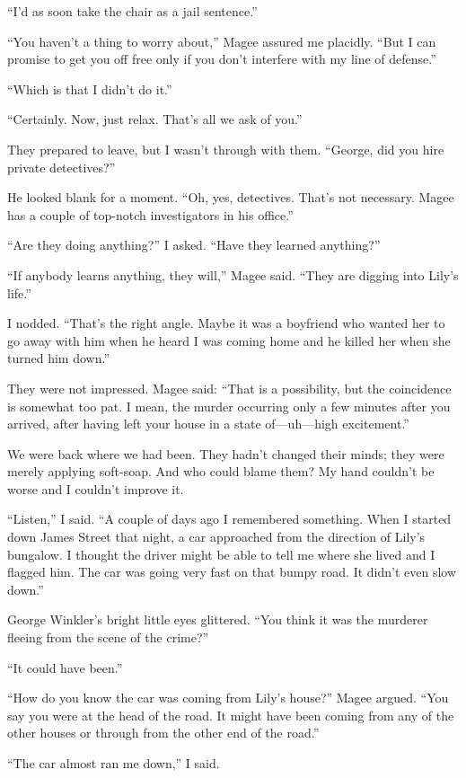 \documentclass{novel}
\begin{document}
“I’d as soon take the chair as a jail sentence.”

“You haven’t a thing to worry about,” Magee assured me placidly. “But I can promise to get you off free only if you don’t interfere with my line of defense.”

“Which is that I didn’t do it.”

“Certainly. Now, just relax. That’s all we ask of you.”

They prepared to leave, but I wasn’t through with them. “George, did you hire private detectives?”

He looked blank for a moment. “Oh, yes, detectives. That’s not necessary. Magee has a couple of top-notch investigators in his office.”

“Are they doing anything?” I asked. “Have they learned anything?”

“If anybody learns anything, they will,” Magee said. “They are digging into Lily’s life.”

I nodded. “That’s the right angle. Maybe it was a boyfriend who wanted her to go away with him when he heard I was coming home and he killed her when she turned him down.”

They were not impressed. Magee said: “That is a possibility, but the coincidence is somewhat too pat. I mean, the murder occurring only a few minutes after you arrived, after having left your house in a state of—uh—high excitement.”

We were back where we had been. They hadn’t changed their minds; they were merely applying soft-soap. And who could blame them? My hand couldn’t be worse and I couldn’t improve it.

“Listen,” I said. “A couple of days ago I remembered something. When I started down James Street that night, a car approached from the direction of Lily’s bungalow. I thought the driver might be able to tell me where she lived and I flagged him. The car was going very fast on that bumpy road. It didn’t even slow down.”

George Winkler’s bright little eyes glittered. “You think it was the murderer fleeing from the scene of the crime?”

“It could have been.”

“How do you know the car was coming from Lily’s house?” Magee argued. “You say you were at the head of the road. It might have been coming from any of the other houses or through from the other end of the road.”

“The car almost ran me down,” I said.
\end{document}
